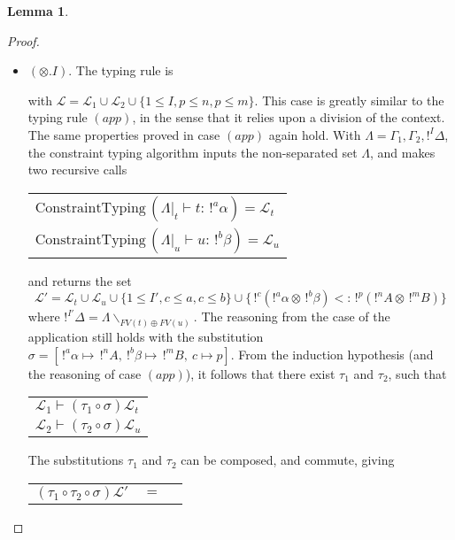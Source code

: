 \documentclass[10pt]{article}
\theoremstyle{plain}
\theoremstyle{definition}
\newtheorem{lemma}{Lemma}[section]
\newcommand{\pair}[2]{\langle #1, #2 \rangle}
\begin{document}
\begin{lemma}
\begin{proof}
\begin{itemize}
			\item $(\otimes.I)$. The typing rule is
				\begin{prooftree}
					\BinaryInfC{$\Gamma_1, \Gamma_2, !^I\Delta \vdash_\mathcal{L} \pair{t}{u} : \,!^p(!^nA \otimes \,!^mB)$}
				\end{prooftree}
				with $\mathcal{L} = \mathcal{L}_1 \cup \mathcal{L}_2 \cup \{ 1 \le I, p \le n, p \le m \}$.
				This case is greatly similar to the typing rule $(app)$, in the sense that it relies upon a division of the context.
				The same properties proved in case $(app)$ again hold.
				With $\Lambda = \Gamma_1, \Gamma_2, !^I \Delta$,
				the constraint typing algorithm inputs the non-separated set $\Lambda$, and makes two recursive calls
			 		\begin{center}
			 		\begin{tabular}{l}
			 			$\text{ConstraintTyping} \, (\Lambda |_t \vdash t : \, !^a\alpha) = \mathcal{L}_t$ \\
			 			$\text{ConstraintTyping} \, (\Lambda |_u \vdash u : \, !^b\beta) = \mathcal{L}_u$
			 		\end{tabular}
			 		\end{center}
			 	and returns the set
			 		$$ \mathcal{L'} = \mathcal{L}_t \cup \mathcal{L}_u \cup \{ 1 \le I', c \le a, c \le b \} \cup
			 			\{ \,!^c(!^a\alpha \otimes \,!^b\beta) <: \,!^p(!^nA \otimes \,!^mB) \} $$
			 	where $!^{I'} \Delta = \Lambda \backslash_{FV(t) \oplus FV(u)}$.
			 	The reasoning from the case of the application still holds with the substitution
			 	$\sigma = [\, !^a\alpha \mapsto \,!^nA, ~!^b\beta \mapsto \,!^mB, ~ c \mapsto p ]$.
			 	From the induction hypothesis (and the reasoning of case $(app)$), it follows that there exist $\tau_1$ and $\tau_2$, such that
			 		\begin{center}
			 		\begin{tabular}{l}
			 			$\mathcal{L}_1 \vdash (\tau_1 \circ \sigma) \mathcal{L}_t$ \\
			 			$\mathcal{L}_2 \vdash (\tau_2 \circ \sigma) \mathcal{L}_u$
			 		\end{tabular}
			 		\end{center}
				The substitutions $\tau_1$ and $\tau_2$ can be composed, and commute, giving
			 		\begin{center}
			 		\begin{tabular}{lcl}
			 			$(\tau_1 \circ \tau_2 \circ \sigma) \mathcal{L}'$ & $=$ & 

\end{tabular}
\end{center}
\end{itemize}
\end{proof}
\end{lemma}
\end{document}
